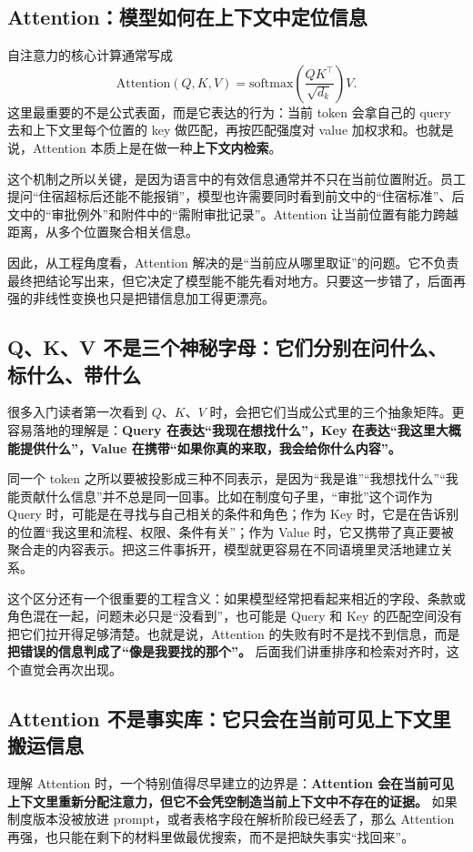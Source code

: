 \subsection{Attention：模型如何在上下文中定位信息}
自注意力的核心计算通常写成
\[
\mathrm{Attention}(Q,K,V)=\mathrm{softmax}\left(\frac{QK^\top}{\sqrt{d_k}}\right)V.
\]
这里最重要的不是公式表面，而是它表达的行为：当前 token 会拿自己的 query 去和上下文里每个位置的 key 做匹配，再按匹配强度对 value 加权求和。也就是说，Attention 本质上是在做一种\textbf{上下文内检索}。

这个机制之所以关键，是因为语言中的有效信息通常并不只在当前位置附近。员工提问“住宿超标后还能不能报销”，模型也许需要同时看到前文中的“住宿标准”、后文中的“审批例外”和附件中的“需附审批记录”。Attention 让当前位置有能力跨越距离，从多个位置聚合相关信息。

因此，从工程角度看，Attention 解决的是“当前应从哪里取证”的问题。它不负责最终把结论写出来，但它决定了模型能不能先看对地方。只要这一步错了，后面再强的非线性变换也只是把错信息加工得更漂亮。

\subsection{Q、K、V 不是三个神秘字母：它们分别在问什么、标什么、带什么}
很多入门读者第一次看到 \(Q\)、\(K\)、\(V\) 时，会把它们当成公式里的三个抽象矩阵。更容易落地的理解是：\textbf{Query 在表达“我现在想找什么”，Key 在表达“我这里大概能提供什么”，Value 在携带“如果你真的来取，我会给你什么内容”。}

同一个 token 之所以要被投影成三种不同表示，是因为“我是谁”“我想找什么”“我能贡献什么信息”并不总是同一回事。比如在制度句子里，“审批”这个词作为 Query 时，可能是在寻找与自己相关的条件和角色；作为 Key 时，它是在告诉别的位置“我这里和流程、权限、条件有关”；作为 Value 时，它又携带了真正要被聚合走的内容表示。把这三件事拆开，模型就更容易在不同语境里灵活地建立关系。

这个区分还有一个很重要的工程含义：如果模型经常把看起来相近的字段、条款或角色混在一起，问题未必只是“没看到”，也可能是 Query 和 Key 的匹配空间没有把它们拉开得足够清楚。也就是说，Attention 的失败有时不是找不到信息，而是\textbf{把错误的信息判成了“像是我要找的那个”。} 后面我们讲重排序和检索对齐时，这个直觉会再次出现。

\subsection{Attention 不是事实库：它只会在当前可见上下文里搬运信息}
理解 Attention 时，一个特别值得尽早建立的边界是：\textbf{Attention 会在当前可见上下文里重新分配注意力，但它不会凭空制造当前上下文中不存在的证据。} 如果制度版本没被放进 prompt，或者表格字段在解析阶段已经丢了，那么 Attention 再强，也只能在剩下的材料里做最优搜索，而不是把缺失事实“找回来”。

